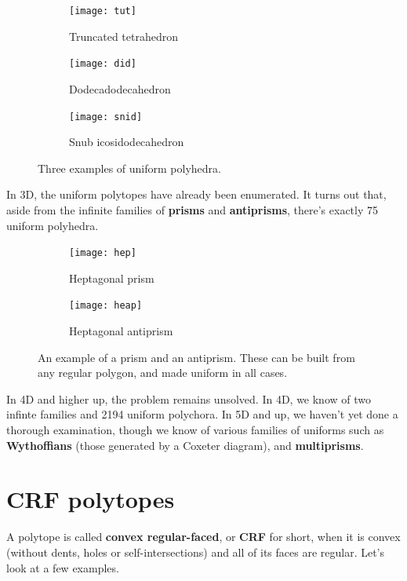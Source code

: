 \documentclass{article}
\begin{document}
\begin{figure}[H]
  \centering
  \begin{subfigure}{.33333\textwidth}
    \centering
    \texttt{[image: tut]}
    \caption{Truncated tetrahedron}
    \label{fig:tut}
  \end{subfigure}%
  \begin{subfigure}{.33333\textwidth}
    \centering
    \texttt{[image: did]}
    \caption{Dodecadodecahedron}
    \label{fig:did}
  \end{subfigure}%
  \begin{subfigure}{.33333\textwidth}
    \centering
    \texttt{[image: snid]}
    \caption{Snub icosidodecahedron}
    \label{fig:snid}
  \end{subfigure}%
  \caption{Three examples of uniform polyhedra.}
  \label{fig:uniforms3D}
\end{figure}

In 3D, the uniform polytopes have already been enumerated. It turns out that, aside from the infinite families of \textbf{prisms} and \textbf{antiprisms}, there's exactly 75 uniform polyhedra.

\begin{figure}[H]
  \centering
  \begin{subfigure}{.5\textwidth}
    \centering
    \texttt{[image: hep]}
    \caption{Heptagonal prism}
    \label{fig:hep}
  \end{subfigure}%
  \begin{subfigure}{.5\textwidth}
    \centering
    \texttt{[image: heap]}
    \caption{Heptagonal antiprism}
    \label{fig:heap}
  \end{subfigure}%
  \caption{An example of a prism and an antiprism. These can be built from any regular polygon, and made uniform in all cases.}
  \label{fig:prisms}
\end{figure}

In 4D and higher up, the problem remains unsolved. In 4D, we know of two infinte families and 2194 uniform polychora. In 5D and up, we haven't yet done a thorough examination, though we know of various families of uniforms such as \textbf{Wythoffians} (those generated by a Coxeter diagram), and \textbf{multiprisms}.

\section{CRF polytopes}
A polytope is called \textbf{convex regular-faced}, or \textbf{CRF} for short, when it is convex (without dents, holes or self-intersections) and all of its faces are regular. Let's look at a few examples.
\end{document}
